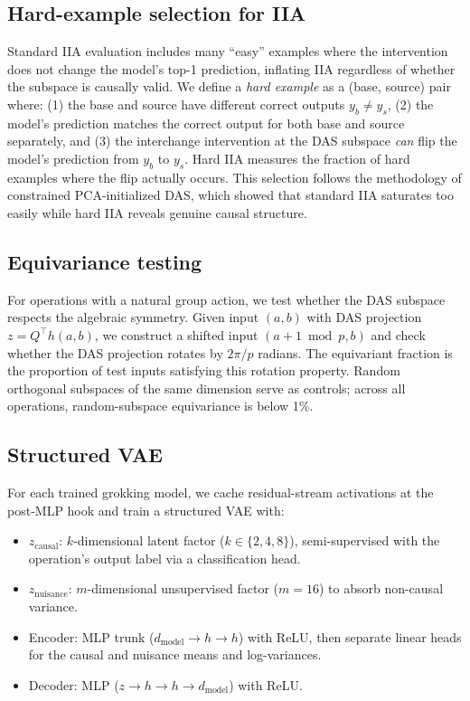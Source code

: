 \documentclass{article}
\begin{document}
\subsection{Hard-example selection for IIA}
\label{sec:hard_examples}

Standard IIA evaluation includes many ``easy'' examples where the intervention
does not change the model's top-1 prediction, inflating IIA regardless of whether
the subspace is causally valid. We define a \emph{hard example} as a
(base, source) pair where: (1) the base and source have different correct outputs
$y_b \neq y_s$, (2) the model's prediction matches the correct output for both
base and source separately, and (3) the interchange intervention at the DAS
subspace \emph{can} flip the model's prediction from $y_b$ to $y_s$. Hard IIA
measures the fraction of hard examples where the flip actually occurs. This
selection follows the methodology of constrained PCA-initialized DAS,
which showed that standard IIA saturates too easily while hard IIA reveals
genuine causal structure.

\subsection{Equivariance testing}

For operations with a natural group action, we test whether the DAS subspace
respects the algebraic symmetry. Given input $(a, b)$ with DAS projection
$z = Q^\top h(a,b)$, we construct a shifted input $(a{+}1 \bmod p, b)$ and
check whether the DAS projection rotates by $2\pi/p$ radians. The equivariant
fraction is the proportion of test inputs satisfying this rotation property.
Random orthogonal subspaces of the same dimension serve as controls; across all
operations, random-subspace equivariance is below 1\%.

\subsection{Structured VAE}
\label{sec:vae_method}

For each trained grokking model, we cache residual-stream activations at the
post-MLP hook and train a structured VAE with:
\begin{itemize}[leftmargin=*]
\item $z_\text{causal}$: $k$-dimensional latent factor ($k \in \{2,4,8\}$),
  semi-supervised with the operation's output label via a classification head.
\item $z_\text{nuisance}$: $m$-dimensional unsupervised factor ($m = 16$) to
  absorb non-causal variance.
\item Encoder: MLP trunk ($d_\text{model} \to h \to h$) with ReLU, then
  separate linear heads for the causal and nuisance means and log-variances.
\item Decoder: MLP ($z \to h \to h \to d_\text{model}$) with ReLU.
\end{itemize}
\end{document}
